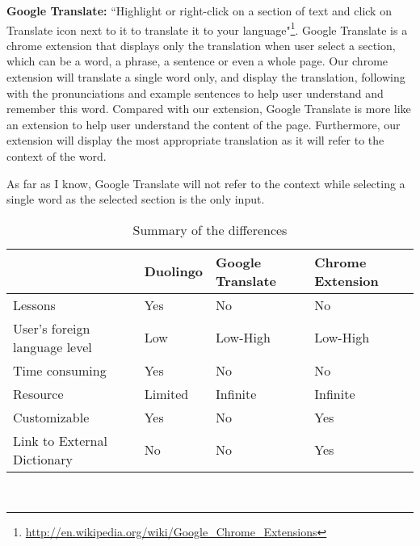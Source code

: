 \textbf{Google Translate:} ``Highlight or right-click on a section of text and click on Translate icon next to it to translate it to your 
language"\footnote{\url{http://en.wikipedia.org/wiki/Google_Chrome_Extensions}}. %
Google Translate is a chrome extension that displays only the translation when user select a section, which can be a word, a phrase, a 
sentence or even a whole page. Our chrome extension will translate a single word only, and display the translation, following with the 
pronunciations and example sentences to help user understand and remember this word. Compared with our extension, Google Translate is more 
like an extension to help user understand the content of the page. Furthermore, our extension will display the most appropriate translation 
as it will refer to the context of the word.

As far as I know, Google Translate will not refer to the context while selecting a single word as the selected section is the only input.
\\
\begin{table}[ht]
  \caption{Summary of the differences}
  \label{table:difference_summary}
  \begin{center}
  \begin{tabular}{| p{2.4cm} | p{1.2cm} | p{1.2cm} |  p{1.2cm} |}
    \hline
    & Duolingo & Google Translate & Chrome Extension \\
    \hline
    Lessons & Yes & No & No \\
    \hline
    User's foreign language level & Low & Low-High & Low-High \\
    \hline
    Time consuming & Yes & No & No\\
    \hline
    Resource & Limited & Infinite & Infinite \\
    \hline
    Customizable & Yes & No & Yes \\
    \hline
    Link to External Dictionary & No & No & Yes \\
    \hline
  \end{tabular}
  \end{center}
\end{table}
\\